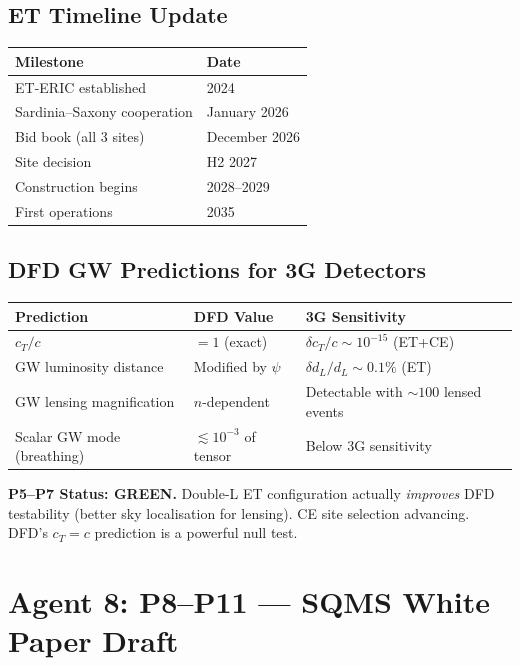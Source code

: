 \documentclass[11pt,a4paper]{article}
\begin{document}
\subsection{ET Timeline Update}

\begin{center}
\begin{tabular}{ll}
\toprule
\textbf{Milestone} & \textbf{Date} \\
\midrule
ET-ERIC established & 2024 \\
Sardinia--Saxony cooperation & January 2026 \\
Bid book (all 3 sites) & December 2026 \\
Site decision & H2 2027 \\
Construction begins & 2028--2029 \\
First operations & 2035 \\
\bottomrule
\end{tabular}
\end{center}

\subsection{DFD GW Predictions for 3G Detectors}

\begin{center}
\begin{tabular}{lll}
\toprule
\textbf{Prediction} & \textbf{DFD Value} & \textbf{3G Sensitivity} \\
\midrule
$c_T / c$ & $= 1$ (exact) & $\delta c_T / c \sim 10^{-15}$ (ET+CE) \\
GW luminosity distance & Modified by $\psi$ & $\delta d_L / d_L \sim 0.1\%$ (ET) \\
GW lensing magnification & $n$-dependent & Detectable with $\sim 100$ lensed events \\
Scalar GW mode (breathing) & $\lesssim 10^{-3}$ of tensor & Below 3G sensitivity \\
\bottomrule
\end{tabular}
\end{center}

\textbf{P5--P7 Status: GREEN.} Double-L ET configuration actually \emph{improves} DFD testability (better sky localisation for lensing). CE site selection advancing. DFD's $c_T = c$ prediction is a powerful null test.

\section{Agent 8: P8--P11 --- SQMS White Paper Draft}
\end{document}
